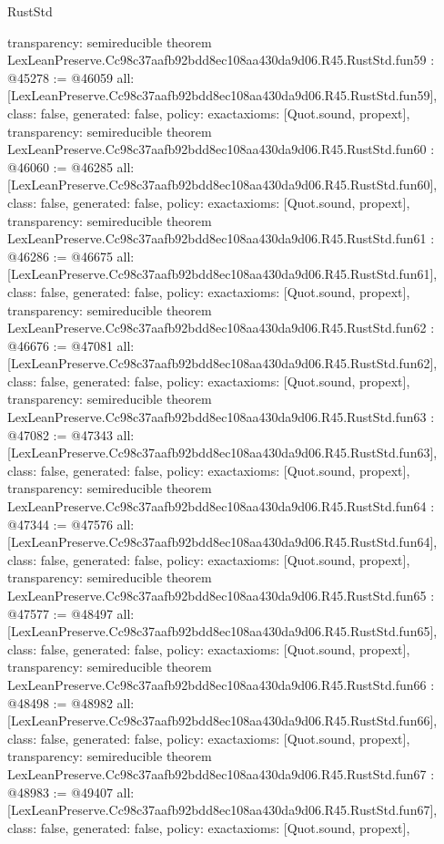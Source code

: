 \begin{lexlean}{RustStd}
\begin{coremodule}
{  transparency: semireducible
}
theorem LexLeanPreserve.Cc98c37aafb92bdd8ec108aa430da9d06.R45.RustStd.fun59 : @45278 := @46059 {
  all: [LexLeanPreserve.Cc98c37aafb92bdd8ec108aa430da9d06.R45.RustStd.fun59],
  class: false,
  generated: false,
  policy: exact{axioms: [Quot.sound, propext]},
  transparency: semireducible
}
theorem LexLeanPreserve.Cc98c37aafb92bdd8ec108aa430da9d06.R45.RustStd.fun60 : @46060 := @46285 {
  all: [LexLeanPreserve.Cc98c37aafb92bdd8ec108aa430da9d06.R45.RustStd.fun60],
  class: false,
  generated: false,
  policy: exact{axioms: [Quot.sound, propext]},
  transparency: semireducible
}
theorem LexLeanPreserve.Cc98c37aafb92bdd8ec108aa430da9d06.R45.RustStd.fun61 : @46286 := @46675 {
  all: [LexLeanPreserve.Cc98c37aafb92bdd8ec108aa430da9d06.R45.RustStd.fun61],
  class: false,
  generated: false,
  policy: exact{axioms: [Quot.sound, propext]},
  transparency: semireducible
}
theorem LexLeanPreserve.Cc98c37aafb92bdd8ec108aa430da9d06.R45.RustStd.fun62 : @46676 := @47081 {
  all: [LexLeanPreserve.Cc98c37aafb92bdd8ec108aa430da9d06.R45.RustStd.fun62],
  class: false,
  generated: false,
  policy: exact{axioms: [Quot.sound, propext]},
  transparency: semireducible
}
theorem LexLeanPreserve.Cc98c37aafb92bdd8ec108aa430da9d06.R45.RustStd.fun63 : @47082 := @47343 {
  all: [LexLeanPreserve.Cc98c37aafb92bdd8ec108aa430da9d06.R45.RustStd.fun63],
  class: false,
  generated: false,
  policy: exact{axioms: [Quot.sound, propext]},
  transparency: semireducible
}
theorem LexLeanPreserve.Cc98c37aafb92bdd8ec108aa430da9d06.R45.RustStd.fun64 : @47344 := @47576 {
  all: [LexLeanPreserve.Cc98c37aafb92bdd8ec108aa430da9d06.R45.RustStd.fun64],
  class: false,
  generated: false,
  policy: exact{axioms: [Quot.sound, propext]},
  transparency: semireducible
}
theorem LexLeanPreserve.Cc98c37aafb92bdd8ec108aa430da9d06.R45.RustStd.fun65 : @47577 := @48497 {
  all: [LexLeanPreserve.Cc98c37aafb92bdd8ec108aa430da9d06.R45.RustStd.fun65],
  class: false,
  generated: false,
  policy: exact{axioms: [Quot.sound, propext]},
  transparency: semireducible
}
theorem LexLeanPreserve.Cc98c37aafb92bdd8ec108aa430da9d06.R45.RustStd.fun66 : @48498 := @48982 {
  all: [LexLeanPreserve.Cc98c37aafb92bdd8ec108aa430da9d06.R45.RustStd.fun66],
  class: false,
  generated: false,
  policy: exact{axioms: [Quot.sound, propext]},
  transparency: semireducible
}
theorem LexLeanPreserve.Cc98c37aafb92bdd8ec108aa430da9d06.R45.RustStd.fun67 : @48983 := @49407 {
  all: [LexLeanPreserve.Cc98c37aafb92bdd8ec108aa430da9d06.R45.RustStd.fun67],
  class: false,
  generated: false,
  policy: exact{axioms: [Quot.sound, propext]},
}
\end{coremodule}
\end{lexlean}
